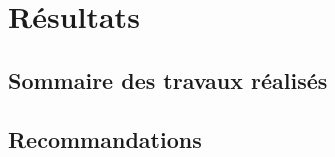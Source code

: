 \section{Résultats} %
\label{sec:resultats}

\subsection{Sommaire des travaux réalisés} %
\label{sub:Sommaire des travaux réalisés}

\subsection{Recommandations} %
\label{subsec:Recommandations}

